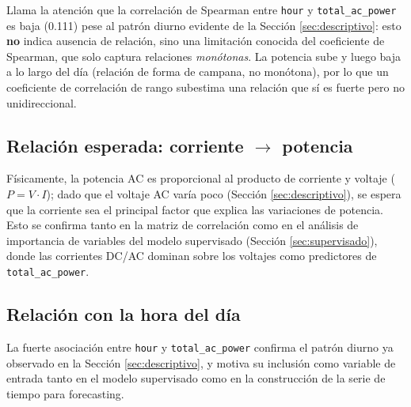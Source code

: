 Llama la atención que la correlación de Spearman entre \texttt{hour} y \texttt{total\_ac\_power} es baja (0.111) pese al patrón diurno evidente de la Sección \ref{sec:descriptivo}: esto \textbf{no} indica ausencia de relación, sino una limitación conocida del coeficiente de Spearman, que solo captura relaciones \textit{monótonas}. La potencia sube y luego baja a lo largo del día (relación de forma de campana, no monótona), por lo que un coeficiente de correlación de rango subestima una relación que sí es fuerte pero no unidireccional.

\subsection*{Relación esperada: corriente $\rightarrow$ potencia}

Físicamente, la potencia AC es proporcional al producto de corriente y voltaje ($P = V \cdot I$); dado que el voltaje AC varía poco (Sección \ref{sec:descriptivo}), se espera que la corriente sea el principal factor que explica las variaciones de potencia. Esto se confirma tanto en la matriz de correlación como en el análisis de importancia de variables del modelo supervisado (Sección \ref{sec:supervisado}), donde las corrientes DC/AC dominan sobre los voltajes como predictores de \texttt{total\_ac\_power}.

\subsection*{Relación con la hora del día}

La fuerte asociación entre \texttt{hour} y \texttt{total\_ac\_power} confirma el patrón diurno ya observado en la Sección \ref{sec:descriptivo}, y motiva su inclusión como variable de entrada tanto en el modelo supervisado como en la construcción de la serie de tiempo para forecasting.
